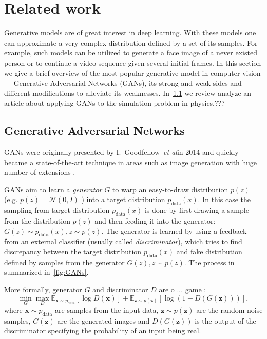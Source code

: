 \documentclass{webofc}
\makeatletter
\newcommand{\onedot}{\futurelet\@let@token\@onedot}
\newcommand{\etal}{\emph{et al}\onedot}
\newcommand{\vx}{\mathbf{x}}
\newcommand{\vz}{\mathbf{z}}
\newcommand{\pdata}{\ensuremath{p_{\text{data}}}}
\makeatother
\begin{document}
\section{Related work}
Generative models are of great interest in deep learning. With these models one can approximate a very complex distribution defined by a set of its samples. For example, such models can be utilized to generate a face image of a never existed person or to continue a video sequence given several initial frames. In this section we give a brief overview of the most popular generative model in computer vision — Generative Adversarial Networks (GANs), its strong and weak sides and different modifications to alleviate its weaknesses. In~\cref{} we review analyze an article about applying GANs to the simulation problem in physics.???

\subsection{Generative Adversarial Networks}
GANs were originally presented by I.~Goodfellow~\etal in 2014 \cite{goodfellow2014generative} and quickly became a state-of-the-art technique in areas such as image generation \cite{radford2015unsupervised} with huge number of extensions \cite{1,2,3,4}.


GANs aim to learn a \textit{generator} $G$ to warp an easy-to-draw distribution $p(z)$ (e.g. $p(z) = \mathcal{N}(0, I)$ ) into a target distribution $\pdata(x)$. In this case the sampling from target distribution $\pdata(x)$ is done by first drawing a sample from the distribution $p(z)$ and then feeding it into the generator: $G(z) \sim \pdata(x), z\sim p(z)$. The generator is learned by using a feedback from an external classifier (usually called \textit{discriminator}), which tries to find discrepancy between the target distribution $\pdata(x)$ and fake distribution defined by samples from the generator $G(z), z\sim p(z)$. The process in summarized in~\cref{fig:GANs}.

More formally, generator $G$ and discriminator $D$ are o ... game : 
\begin{equation}\label{eq:gan}
\min_G \max_D \mathbb{E}_{\vx \sim \pdata} [\log D(\vx)] + \mathbb{E}_{\vz \sim p(\vz)} [\log(1 - D(G(\vz)))],
\end{equation} 
where $\vx \sim \pdata$ are samples from the input data, $\vz \sim p(\vz)$ are the random noise samples, $G(\vz)$ are the generated images and $D(G(\vz))$ is the output of the discriminator specifying the probability of an input being real.
\end{document}
